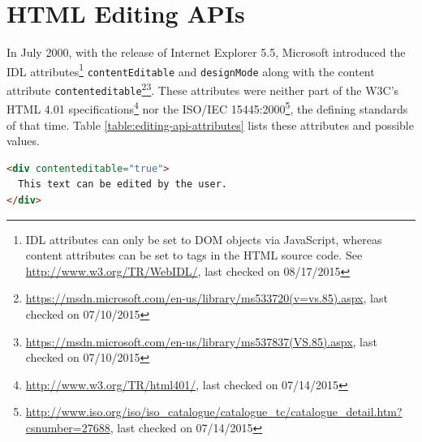 \section{HTML Editing APIs}
\label{sec:html-editing-apis}

In July 2000, with the release of Internet Explorer 5.5, Microsoft introduced the IDL attributes\footnote{IDL attributes can only be set to DOM objects via JavaScript, whereas content attributes can be set to tags in the HTML source code. See \url{http://www.w3.org/TR/WebIDL/}, last checked on 08/17/2015} \texttt{contentEditable} and \texttt{designMode} along with the content attribute \texttt{contenteditable}\footnote{\url{https://msdn.microsoft.com/en-us/library/ms533720(v=vs.85).aspx}, last checked on 07/10/2015}\footnote{\url{https://msdn.microsoft.com/en-us/library/ms537837(VS.85).aspx}, last checked on 07/10/2015}. These attributes were neither part of the W3C's HTML 4.01 specifications\footnote{\url{http://www.w3.org/TR/html401/}, last checked on 07/14/2015} nor the ISO/IEC 15445:2000\footnote{\url{http://www.iso.org/iso/iso\_catalogue/catalogue\_tc/catalogue\_detail.htm?csnumber=27688}, last checked on 07/14/2015}, the defining standards of that time. Table \ref{table:editing-api-attributes} lists these attributes and possible values.

\begin{table}[]
\centering
{}
\caption{Editing API attributes}
\label{table:editing-api-attributes}
\end{table}

\begin{lstlisting}[language=html, caption=An element set to editing mode, label=lst:div-contenteditable]
<div contenteditable="true">
  This text can be edited by the user.
</div>
\end{lstlisting}

